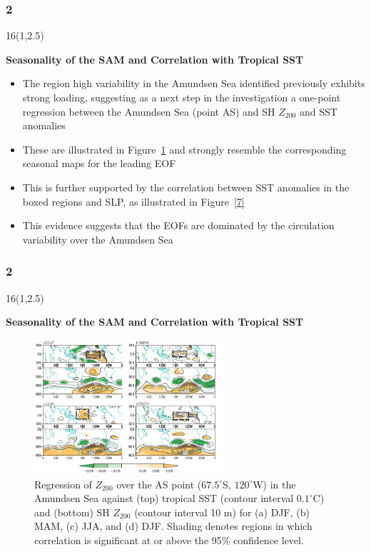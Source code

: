 \documentclass{beamer}
\newcommand\FrameText[1]{
\begin{textblock}{16}(1,2.5)
\raggedright #1
\end{textblock}}
\begin{document}
\begin{frame}
\frametitle{2}
\FrameText{\bf{\large Seasonality of the SAM and Correlation with Tropical SST}}
\begin{itemize}
\item The region high variability in the Amundsen Sea identified previously
  exhibits strong loading, suggesting as a next step in the
  investigation a one-point regression between the Amundsen Sea (point AS) and SH $Z_{200}$ and
  SST anomalies
\item These are illustrated in Figure~\ref{6} and strongly
  resemble the corresponding seasonal maps for the leading EOF
\item This is further supported by the correlation between SST anomalies in the
  boxed regions and SLP, as illustrated in Figure~\ref{7} 
\item This evidence suggests that the EOFs are dominated by the
  circulation variability over the Amundsen Sea
\end{itemize}
\end{frame}

\begin{frame}
\frametitle{2}
\FrameText{\bf{\large Seasonality of the SAM and Correlation
with Tropical SST}}
\begin{figure}
\centering
\includegraphics[width=7cm]{6.png}
\caption{\tiny Regression of $Z_{200}$ over the AS point
  ($67.5^{\circ}$S, $120^{\circ}$W) in the Amundsen Sea against (top)
  tropical SST (contour interval $0.1^{\circ}$C) and (bottom) SH $Z_{200}$ (contour interval 10 m) for (a) DJF, (b) MAM, (c) JJA, and (d) DJF.
Shading denotes regions in which correlation is significant at or above the 95\% confidence level.}
\label{6}
\end{figure}
\end{frame}
\end{document}
